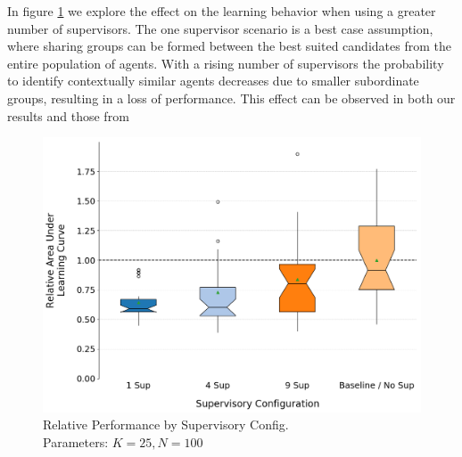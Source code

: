 \documentclass[letterpaper]{article}
\begin{document}
In figure \ref{fig:sups} we explore the effect on the learning behavior when using a greater number of supervisors. The one supervisor scenario is a best case assumption, where sharing groups can be formed between the best suited candidates from the entire population of agents. With a rising number of supervisors the probability to identify contextually similar agents decreases due to smaller subordinate groups, resulting in a loss of performance. This effect can be observed in both our results and those from \citeauthor{garant2015accelerating}
\begin{figure}[H]
 \begin{center}
  \includegraphics[width=\linewidth]{figures/figure7}
  \caption{Relative Performance by Supervisory Config.\\Parameters: $K=25,N=100$}
  \label{fig:sups}
 \end{center}
\end{figure}
\end{document}
